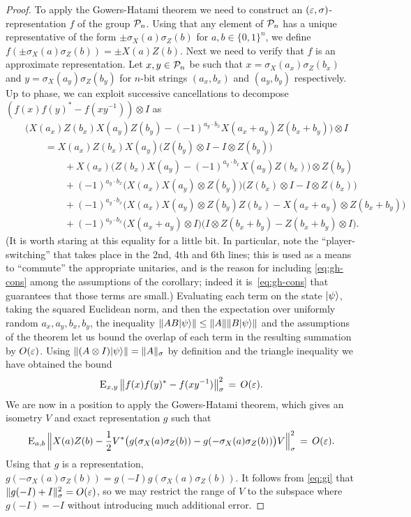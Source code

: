 \begin{proof} 
To apply the Gowers-Hatami theorem we need to construct an $(\varepsilon,\sigma)$-representation $f$ of the group $\mathcal{P}_n$. Using that any element of $\mathcal{P}_n$ has a unique representative of the form $\pm \sigma_X(a)\sigma_Z(b)$ for $a,b\in\{0,1\}^n$, we define $f(\pm \sigma_X(a)\sigma_Z(b)) = \pm X(a)Z(b)$. Next we need to verify that $f$ is an approximate representation. Let $x,y\in \mathcal{P}_n$ be such that $x=\sigma_X(a_x)\sigma_Z(b_x)$ and $y=\sigma_X(a_y)\sigma_Z(b_y)$ for $n$-bit strings $(a_x,b_x)$ and $(a_y,b_y)$ respectively. Up to phase, we can exploit successive cancellations to decompose $(f(x)f(y)^*-f(xy^{-1}))\otimes I$ as
\begin{eqnarray*}
&&\big( X(a_x)Z(b_x)X(a_y)Z(b_y) -(-1)^{a_y\cdot b_x} X(a_x+a_y) Z(b_x+b_y)\big)\otimes I \\ 
&&\qquad =  X(a_x)Z(b_x)X(a_y)\big (Z(b_y)\otimes I - I\otimes Z(b_y)\big)\\
&& \qquad\qquad+ X(a_x)\big(Z(b_x)X(a_y) - (-1)^{a_y\cdot b_x} X(a_y)Z(b_x)\big)\otimes Z(b_y)\\
&& \qquad\qquad+(-1)^{a_y\cdot b_x} \big( X(a_x)X(a_y)\otimes Z(b_y)\big) \big( Z(b_x)\otimes I - I\otimes Z(b_x)\big)\\
&& \qquad\qquad+  (-1)^{a_y\cdot b_x}  \big( X(a_x)X(a_y)\otimes Z(b_y)Z(b_x) - X(a_x+a_y)\otimes Z(b_x+b_y)\big)\\
&& \qquad\qquad+  (-1)^{a_y\cdot b_x} \big(  X(a_x+a_y)\otimes I \big)\big(I\otimes Z(b_x+b_y) - Z(b_x+b_y)\otimes I\big).
\end{eqnarray*}
(It is worth staring at this equality for a little bit. In particular, note the ``player-switching'' that takes place in the 2nd, 4th and 6th lines; this is used as a means to ``commute'' the appropriate unitaries, and is the reason for including \eqref{eq:gh-cons} among the assumptions of the corollary; indeed it is~\eqref{eq:gh-cons} that guarantees that those terms are small.)
Evaluating each term on the state $|\psi\rangle$, taking the squared Euclidean norm, and then the expectation over uniformly random $a_x,a_y,b_x,b_y$, the inequality $\| AB|\psi\rangle\| \leq \|A\|\|B|\psi\rangle\|$ and the assumptions of the theorem let us bound the overlap of each term in the resulting summation by $O({\varepsilon})$. Using $\| (A\otimes I) |\psi\rangle\| = \|A\|_\sigma$ by definition and the triangle inequality we have obtained the bound
$$ \textsc{E}_{x,y}\,\big\|f(x)f(y)^* - f(xy^{-1})\big\|_\sigma^2 \,=\, O({\varepsilon}).$$
We are now in a position to apply the Gowers-Hatami theorem, which gives an isometry $V$ and exact representation $g$ such that
\begin{equation}\label{eq:gi}
\textsc{E}_{a,b}\,\Big\|  X(a)Z(b)- \frac{1}{2}V^*\big( g(\sigma_X(a)\sigma_Z(b))  -  g(-\sigma_X(a)\sigma_Z(b))\big)V\Big\|_\sigma^2 \,=\, O({\varepsilon}). 
\end{equation}
Using that $g$ is a representation, $g(-\sigma_X(a)\sigma_Z(b)) = g(-I)g(\sigma_X(a)\sigma_Z(b))$. It follows from \eqref{eq:gi} that $\|g(-I) + I \|_\sigma^2 = O({\varepsilon})$, so we may restrict the range of $V$ to the subspace where $g(-I)=-I$ without introducing much additional error. 
\end{proof}



